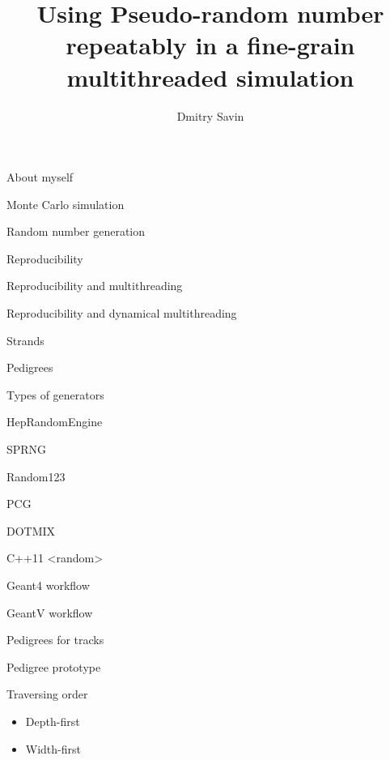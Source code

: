 \documentclass{beamer}
\title{Using Pseudo-random number repeatably in a fine-grain multithreaded simulation}
\author{Dmitry Savin}
\begin{document}
 \begin{frame}{About myself}
 \end{frame}

 \begin{frame}{Monte Carlo simulation}
 \end{frame}

 \begin{frame}{Random number generation}
 \end{frame}
 
 \begin{frame}{Reproducibility}
 \end{frame}
 
 \begin{frame}{Reproducibility and multithreading}
 \end{frame}
 
 \begin{frame}{Reproducibility and dynamical multithreading}
 \end{frame}

 \begin{frame}{Strands}
 \end{frame}

 \begin{frame}{Pedigrees}
 \end{frame}

 \begin{frame}{Types of generators}
 \end{frame}

 \begin{frame}{HepRandomEngine}
 \end{frame}

 \begin{frame}{SPRNG}
 \end{frame}

 \begin{frame}{Random123}
 \end{frame}
 
 \begin{frame}{PCG}
 \end{frame}
 
 \begin{frame}{DOTMIX}
 \end{frame}
 
 \begin{frame}{C++11 <random>}
 \end{frame}
 
 \begin{frame}{Geant4 workflow}
 \end{frame}

 \begin{frame}{GeantV workflow}
 \end{frame}
 
 \begin{frame}{Pedigrees for tracks}
 \end{frame}
 
 \begin{frame}{Pedigree prototype}
 \end{frame}
 
 \begin{frame}{Traversing order}
 \begin{itemize}
  \item Depth-first
  \item Width-first
 \end{itemize}

 \end{frame}
 
\end{document}
